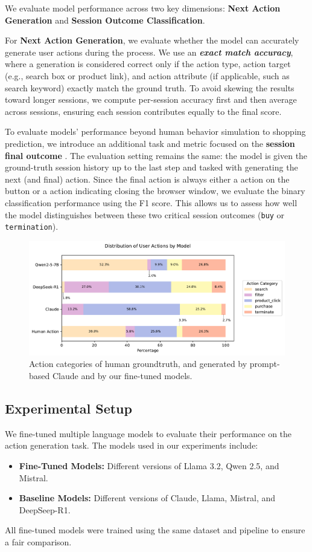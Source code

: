 \documentclass[11pt]{article}
\begin{document}
We evaluate model performance across two key dimensions: \textbf{Next Action Generation} and \textbf{Session Outcome Classification}.

For \textbf{Next Action Generation}, we evaluate whether the model can accurately generate user actions during the process.
We use an \textit{\textbf{exact match accuracy}}, where a generation is considered correct only if the action type, action target (e.g., search box or product link), and action attribute (if applicable, such as search keyword) exactly match the ground truth. 
To avoid skewing the results toward longer sessions, we compute per-session accuracy first and then average across sessions, ensuring each session contributes equally to the final score.

To evaluate models' performance beyond human behavior simulation to shopping prediction, we introduce an additional task and metric focused on the \textbf{session final outcome }. 
The evaluation setting remains the same: the model is given the ground-truth session history up to the last step and tasked with generating the next (and final) action. 
Since the final action is always either a  action on the  button or a  action indicating closing the browser window, we evaluate the binary classification performance using the F1 score. 
This allows us to assess how well the model distinguishes between these two critical session outcomes (\texttt{buy} or \texttt{termination}).



\begin{figure}[t]
    \centering
    \includegraphics[width=.7\linewidth]{figures/action_distribution_below_labels}
    \caption{Action categories of human groundtruth, and generated by prompt-based Claude and by our fine-tuned models.}
    \label{fig:action-distribution}
    \vspace{-\baselineskip}
\end{figure}


\subsection{Experimental Setup}
We fine-tuned multiple language models to evaluate their performance on the action generation task. The models used in our experiments include:
\begin{itemize}
    \item \textbf{Fine-Tuned Models:} Different versions of Llama 3.2, Qwen 2.5, and Mistral.
    \item \textbf{Baseline Models:} Different versions of Claude, Llama, Mistral, and DeepSeep-R1.
\end{itemize}
All fine-tuned models were trained using the same dataset and pipeline to ensure a fair comparison. 
\end{document}
